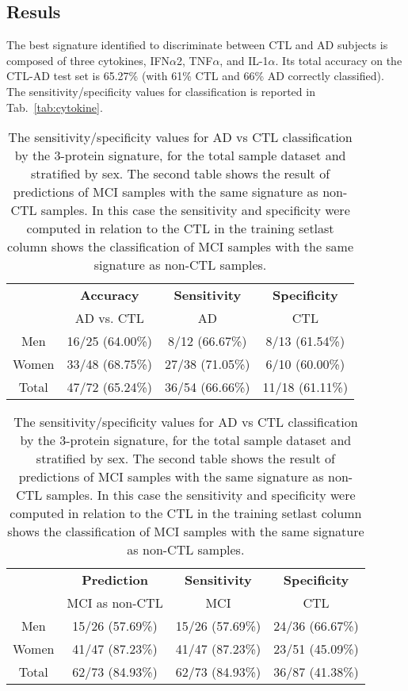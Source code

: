 \documentclass{standalone}
\begin{document}
\subsection[Results]{Resuls}\label{cytokine_result}

The best signature identified to discriminate between CTL and AD subjects is composed of three cytokines, IFN$\alpha$2, TNF$\alpha$, and IL-1$\alpha$.
Its total accuracy on the CTL-AD test set is 65.27\% (with 61\% CTL and 66\% AD correctly classified).
The sensitivity/specificity values for classification is reported in Tab.~\ref{tab:cytokine}.

\begin{table}[!htb]
  \begin{minipage}{.5\linewidth}
    \caption{}
    \centering
      \begin{tabular}{cccc}
          \hline \rowcolor{darkgrayrow}
                      &  \textbf{Accuracy}  &  \textbf{Sensitivity}  &  \textbf{Specificity} \\
                      &  AD vs. CTL         &  AD                    &    CTL                \\
          \hline
              Men     &    16/25 (64.00\%)  &    8/12 (66.67\%)      &    8/13 (61.54\%)     \\
              Women   &    33/48 (68.75\%)  &   27/38 (71.05\%)      &    6/10 (60.00\%)     \\
              Total   &    47/72 (65.24\%)  &   36/54 (66.66\%)      &   11/18 (61.11\%)     \\
          \hline
      \end{tabular}
  \end{minipage}%
  \begin{minipage}{.5\linewidth}
    \centering
      \caption{}
      \begin{tabular}{cccc}
          \hline \rowcolor{darkgrayrow}
                      & \textbf{Prediction} &  \textbf{Sensitivity}  &  \textbf{Specificity} \\
                      &  MCI as non-CTL     &  MCI                   &    CTL                \\
          \hline
              Men     &    15/26 (57.69\%)  &   15/26 (57.69\%)      &   24/36 (66.67\%)     \\
              Women   &    41/47 (87.23\%)  &   41/47 (87.23\%)      &   23/51 (45.09\%)     \\
              Total   &    62/73 (84.93\%)  &   62/73 (84.93\%)      &   36/87 (41.38\%)     \\
          \hline
      \end{tabular}
  \end{minipage}
  \caption{The sensitivity/specificity values for AD vs CTL classification by the 3-protein signature, for the total sample dataset and stratified by sex.
    The second table shows the result of predictions of MCI samples with the same signature as non-CTL samples.
    In this case the sensitivity and specificity were computed in relation to the CTL in the training setlast column  shows the classification of MCI samples with the same signature as non-CTL samples.
  }
\end{table}
\end{document}
